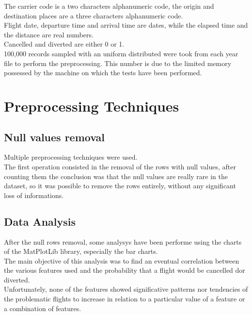 \documentclass[
	letterpaper, %
	10pt, %
]{class}
\begin{document}
The carrier code is a two characters alphanumeric code, the origin and destination places are a three characters alphanumeric code.\\
Flight date, departure time and arrival time are dates, while the elapsed time and the distance are real numbers.\\
Cancelled and diverted are either 0 or 1.\\

100,000 records sampled with an uniform distributed were took from each year file to perform the preprocessing. This number is due to the limited memory
possessed by the machine on which the tests have been performed.


\section{Preprocessing Techniques}

\subsection{Null values removal}

Multiple preprocessing techniques were used.\\

The first operation consisted in the removal of the rows with null values, after counting them the conclusion was that the null values are really rare in the dataset, so it was possible to remove the rows entirely, without any significant loss of informations.\\

\subsection{Data Analysis}
After the null rows removal, some analysys have been performe using the charts of the MatPlotLib library, especially the bar charts.\\
The main objective of this analysis was to find an eventual correlation between the various features used and the probability that a flight would be cancelled dor diverted.\\

Unfortunately, none of the features showed significative patterns nor tendencies of the problematic flights to increase in relation to a particular value of a feature or a combination of features.\\
\end{document}
